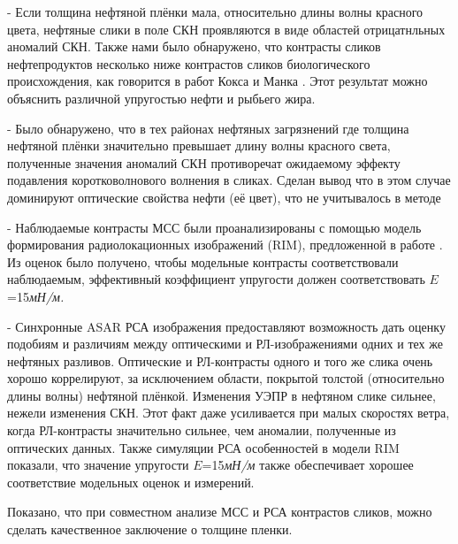 - Если толщина нефтяной плёнки мала, относительно длины волны красного цвета, нефтяные слики в поле СКН проявляются в виде  областей отрицатнльных аномалий СКН. Также нами было обнаружено, что контрасты сликов нефтепродуктов несколько ниже контрастов сликов биологического происхождения, как говорится в работ Кокса и Манка \citep{Cox1954, 1954a, 1956}. Этот результат можно объяснить различной упругостью нефти и рыбьего жира.

- Было обнаружено, что в тех районах нефтяных загрязнений где толщина нефтяной плёнки значительно превышает длину волны красного света, полученные значения аномалий СКН противоречат ожидаемому эффекту подавления коротковолнового волнения в сликах. Сделан вывод что в этом случае доминируют оптические свойства нефти (её цвет), что не учитывалось в методе

- Наблюдаемые контрасты МСС были проанализированы с помощью модель формирования радиолокационных изображений (RIM), предложенной в работе  \citep{Kudryavtsev2005, 2008}. Из оценок было получено, чтобы модельные контрасты соответствовали наблюдаемым, эффективный коэффициент упругости должен соответствовать $E$=15\textit{мН/м.}

- Синхронные ASAR РСА изображения предоставляют возможность дать оценку подобиям и различиям между оптическими и РЛ-изображениями одних и тех же нефтяных разливов. Оптические и РЛ-контрасты одного и того же слика очень хорошо коррелируют, за исключением области, покрытой толстой (относительно длины волны) нефтяной плёнкой. Изменения УЭПР в нефтяном слике сильнее, нежели изменения СКН. Этот факт даже усиливается при малых скоростях ветра, когда РЛ-контрасты значительно сильнее, чем аномалии, полученные из оптических данных. Также симуляции РСА особенностей в модели RIM показали, что значение упругости $E$=15\textit{мН/м }также обеспечивает хорошее соответствие модельных оценок и измерений.

\noindent 

Показано, что при совместном анализе МСС и РСА контрастов сликов, можно сделать качественное заключение о толщине пленки. 




\clearpage